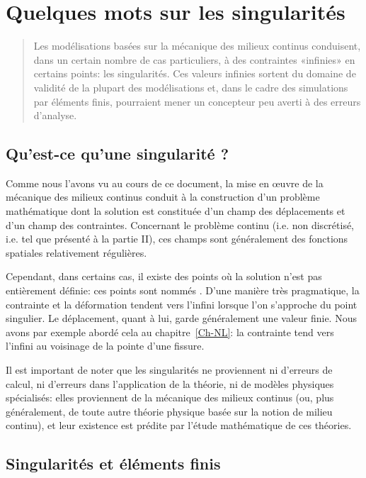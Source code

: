 \chapter{Quelques mots sur les singularités}\label{Ch-Singul}

\begin{abstract}
Les modélisations basées sur la mécanique des milieux continus conduisent, dans un certain nombre de cas particuliers, à des contraintes «infinies» en certains points: les singularités. Ces valeurs infinies sortent du domaine de validité de la plupart des modélisations et, dans le cadre des simulations par éléments finis, pourraient mener un concepteur peu averti à des erreurs d'analyse.
\end{abstract}


\medskip
\section{Qu'est-ce qu'une singularité ?}

Comme nous l'avons vu au cours de ce document, la mise en œuvre de la mécanique des milieux continus conduit à la construction d'un problème mathématique dont la solution est constituée d'un champ des déplacements et d'un champ des contraintes. Concernant le problème continu (i.e. non discrétisé, i.e. tel que présenté à la partie II), ces champs sont généralement des fonctions spatiales relativement régulières.

\medskip
Cependant, dans certains cas, il existe des points où la solution n'est pas entièrement définie: ces points sont nommés . D'une manière très pragmatique, la contrainte et la déformation tendent vers l'infini lorsque l'on s'approche du point singulier. Le déplacement, quant à lui, garde généralement une valeur finie. Nous avons par exemple abordé cela au chapitre~\ref{Ch-NL}: la contrainte tend vers l'infini au voisinage de la pointe d'une fissure.

\medskip
Il est important de noter que les singularités ne proviennent ni d'erreurs de calcul, ni d'erreurs dans l'application de la théorie, ni de modèles physiques spécialisés: elles proviennent de la mécanique des milieux continus (ou, plus généralement, de toute autre théorie physique basée sur la notion de milieu continu), et leur existence est prédite par l'étude mathématique de ces théories.

\medskip
\section{Singularités et éléments finis}

